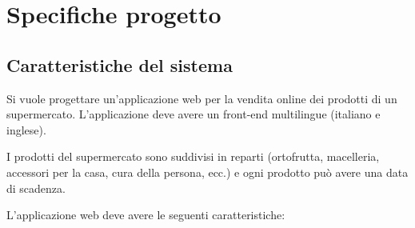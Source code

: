 
\chapter{Specifiche progetto}
\label{cap:specifiche-progetto}

\section{Caratteristiche del sistema}
Si vuole progettare un'applicazione web per la vendita online dei prodotti di un supermercato.
L'applicazione deve avere un front-end multilingue (italiano e inglese).

I prodotti del supermercato sono suddivisi in reparti (ortofrutta, macelleria, accessori per la casa, cura della persona, ecc.) e ogni prodotto può avere una data di scadenza.

L'applicazione web deve avere le seguenti caratteristiche:

